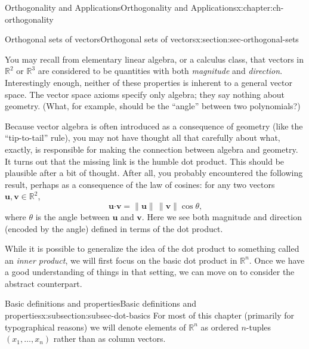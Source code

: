 \documentclass[oneside,10pt,]{book}
\numberwithin{equation}{section}
\newcommand{\R}{\mathbb{R}}
\newcommand{\dotp}{\!\boldsymbol{\cdot}\!}
\newcommand{\len}[1]{\lVert #1\rVert}
\newcommand{\uu}{\mathbf{u}}
\newcommand{\vv}{\mathbf{v}}
\begin{document}
\begin{chapterptx}{Orthogonality and Applications}{}{Orthogonality and Applications}{}{}{x:chapter:ch-orthogonality}
%
%
\typeout{************************************************}
\typeout{************************************************}
%
\begin{sectionptx}{Orthogonal sets of vectors}{}{Orthogonal sets of vectors}{}{}{x:section:sec-orthogonal-sets}
\begin{introduction}{}%
You may recall from elementary linear algebra, or a calculus class, that vectors in \(\R^2\) or \(\R^3\) are considered to be quantities with both \emph{magnitude} and \emph{direction}. Interestingly enough, neither of these properties is inherent to a general vector space. The vector space axioms specify only algebra; they say nothing about geometry. (What, for example, should be the ``angle'' between two polynomials?)%
\par
Because vector algebra is often introduced as a consequence of geometry (like the ``tip-to-tail'' rule), you may not have thought all that carefully about what, exactly, is responsible for making the connection between algebra and geometry. It turns out that the missing link is the humble dot product. This should be plausible after a bit of thought. After all, you probably encountered the following result, perhaps as a consequence of the law of cosines: for any two vectors \(\uu,\vv\in\R^2\),%
\begin{equation*}
\uu\dotp\vv = \len{\uu}\,\len{\vv}\cos\theta\text{,}
\end{equation*}
where \(\theta\) is the angle between \(\uu\) and \(\vv\). Here we see both magnitude and direction (encoded by the angle) defined in terms of the dot product.%
\par
While it is possible to generalize the idea of the dot product to something called an \emph{inner product}, we will first focus on the basic dot product in \(\R^n\). Once we have a good understanding of things in that setting, we can move on to consider the abstract counterpart.%
\end{introduction}%
%
%
\typeout{************************************************}
\typeout{************************************************}
%
\begin{subsectionptx}{Basic definitions and properties}{}{Basic definitions and properties}{}{}{x:subsection:subsec-dot-basics}
For most of this chapter (primarily for typographical reasons) we will denote elements of \(\R^n\) as ordered \(n\)-tuples \((x_1,\ldots, x_n)\) rather than as column vectors.%

\end{subsectionptx}
\end{sectionptx}
\end{chapterptx}
\end{document}
